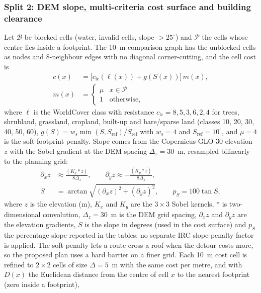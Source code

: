 \documentclass[preprint,12pt]{elsarticle}
\begin{document}
\subsubsection{Split 2: DEM slope, multi-criteria cost surface and building clearance}\label{sec:cost}
Let $\mathcal B$ be blocked cells (water, invalid cells, slope $>25^{\circ}$) and $\mathcal P$ the cells whose centre lies inside a footprint. The 10~m comparison graph has the unblocked cells as nodes and 8-neighbour edges with no diagonal corner-cutting, and the cell cost is
\begin{equation}
\begin{aligned}
c(x)&=\bigl[c_{\mathrm{lc}}(\ell(x))+g(S(x))\bigr]\,m(x),\\
m(x)&=\begin{cases}\mu & x\in\mathcal P\\ 1 & \text{otherwise,}\end{cases}
\end{aligned}
\label{eq:cell}
\end{equation}
where $\ell$ is the WorldCover class with resistance $c_{\mathrm{lc}}=8,5,3,6,2,4$ for trees, shrubland, grassland, cropland, built-up and bare/sparse land (classes 10, 20, 30, 40, 50, 60), $g(S)=w_s\min(S,S_{\mathrm{ref}})/S_{\mathrm{ref}}$ with $w_s=4$ and $S_{\mathrm{ref}}=10^{\circ}$, and $\mu=4$ is the soft footprint penalty. Slope comes from the Copernicus GLO-30 elevation $z$ with the Sobel gradient \cite{sobel1968gradient,horn1981hill} at the DEM spacing $\Delta_z=30$~m, resampled bilinearly to the planning grid:
\begin{equation}
\begin{aligned}
\partial_x z&\approx\frac{(K_x{*}z)}{8\Delta_z},\qquad \partial_y z\approx-\frac{(K_y{*}z)}{8\Delta_z},\\
S&=\arctan\sqrt{(\partial_x z)^2+(\partial_y z)^2},\qquad p_S=100\tan S,
\end{aligned}
\label{eq:slope}
\end{equation}
where $z$ is the elevation (m), $K_x$ and $K_y$ are the $3\times3$ Sobel kernels, $*$ is two-dimensional convolution, $\Delta_z=30$~m is the DEM grid spacing, $\partial_x z$ and $\partial_y z$ are the elevation gradients, $S$ is the slope in degrees (used in the cost surface) and $p_S$ the percentage slope reported in the tables; no separate IRC slope-penalty factor is applied. The soft penalty lets a route cross a roof when the detour costs more, so the proposed plan uses a hard barrier on a finer grid. Each 10~m cost cell is refined to $2\times2$ cells of size $\Delta=5$~m with the same cost per metre, and with $D(x)$ the Euclidean distance from the centre of cell $x$ to the nearest footprint (zero inside a footprint),
\end{document}
